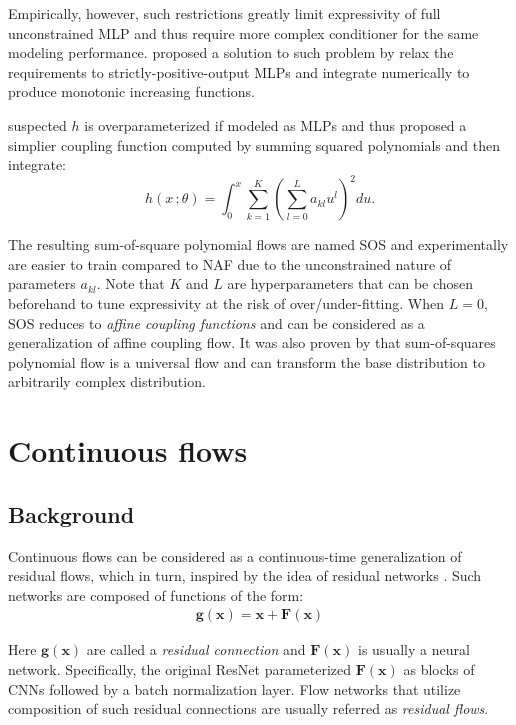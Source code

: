 Empirically, however, such restrictions greatly limit expressivity of full
unconstrained MLP and thus require more complex conditioner for the same
modeling performance. \cite{wehenkelUnconstrainedMonotonicNeural2019} proposed a
solution to such problem by relax the requirements to strictly-positive-output
MLPs and integrate numerically to produce monotonic increasing
functions.

\cite{jainiSumofSquaresPolynomialFlow2019} suspected
$h$ is overparameterized if modeled as MLPs and thus proposed a
simplier coupling function computed by summing squared polynomials and then integrate:
$$
h(x\,;\theta) =  \int_{0}^x \sum_{k=1}^K \left(\sum_{l=0}^L a_{kl}u^l \right)^2 du
.$$

The resulting sum-of-square polynomial flows are named SOS
\cite{jainiSumofSquaresPolynomialFlow2019} and experimentally are easier to
train compared to NAF due to the unconstrained nature of parameters $a_{kl}$.
Note that $K$ and $L$ are hyperparameters that can be chosen beforehand to tune
expressivity at the risk of over/under-fitting. When $L=0$, SOS reduces to
\textit{affine coupling functions} and can be considered as a generalization of
affine coupling flow. It was also proven by
\cite{jainiSumofSquaresPolynomialFlow2019} that sum-of-squares polynomial flow
is a universal flow and can transform the base distribution to arbitrarily
complex distribution.

\section{Continuous flows}
\subsection{Background}
Continuous flows can be considered as a continuous-time generalization of
residual flows, which in turn, inspired by the idea of residual
networks \cite{heDeepResidualLearning2016}. Such networks are composed of functions of the form:
\begin{align}
\label{f:res}
\mathbf{g}(\mathbf{x}) = \mathbf{x} + \mathbf{F}(\mathbf{x})
\end{align}

Here $\mathbf{g}(\mathbf{x})$ are called a \textit{residual connection} and
$\mathbf{F}(\mathbf{x})$ is usually a neural network. Specifically, the original
ResNet \cite{heDeepResidualLearning2016} parameterized $\mathbf{F}(\mathbf{x})$
as blocks of CNNs followed by a batch normalization layer. Flow networks that
utilize composition of such residual connections are usually referred as
\textit{residual flows}.

